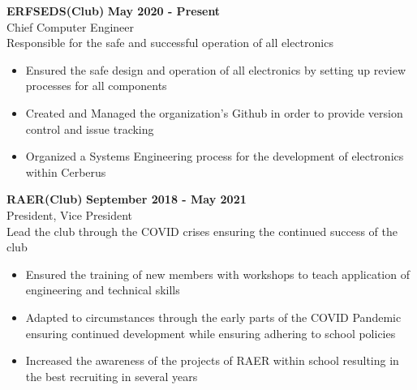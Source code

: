 \documentclass[10pt]{article}
\newcommand{\entrySpacing}{4pt}
\begin{document}
\noindent\begin{minipage}{\linewidth}
\textbf{ERFSEDS(Club)} \hfill \textbf{May 2020 - Present}\\
Chief Computer Engineer\hfill \\Responsible for the safe and successful operation of all electronics
\begin{itemize}[noitemsep,nolistsep]
\item Ensured the safe design and operation of all electronics by setting up review processes for all components
\item Created and Managed the organization's Github in order to provide version control and issue tracking
\item Organized a Systems Engineering process for the development of electronics within Cerberus
\end{itemize}


\end{minipage}
\vspace{\entrySpacing}

\noindent\begin{minipage}{\linewidth}
\textbf{RAER(Club)} \hfill \textbf{September 2018 - May 2021}\\
President, Vice President\hfill \\Lead the club through the COVID crises ensuring the continued success of the club
\begin{itemize}[noitemsep,nolistsep]
\item Ensured the training of new members with workshops to teach application of engineering and technical skills
\item Adapted to circumstances through the early parts of the COVID  Pandemic ensuring continued development while ensuring adhering to school policies
\item Increased the awareness of the projects of RAER within school resulting in the best recruiting in several years
\end{itemize}


\end{minipage}
\vspace{\entrySpacing}
\end{document}
